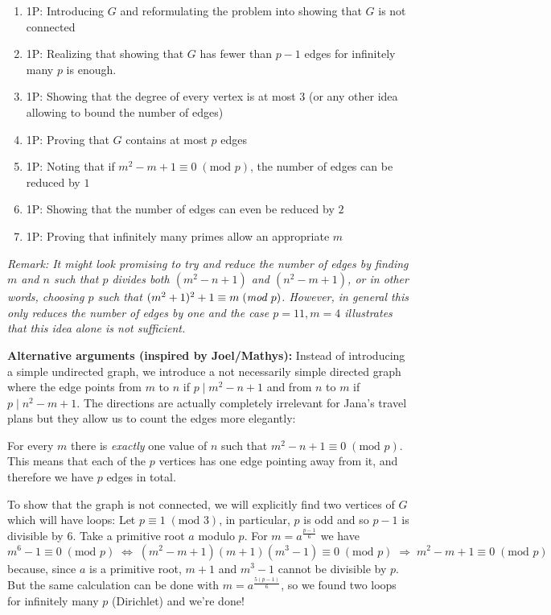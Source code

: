 {\begin{enumerate}
\item 1P: Introducing $G$ and reformulating the problem into showing that $G$ is not connected
\item 1P: Realizing that showing that $G$ has fewer than $p-1$ edges for infinitely many $p$ is enough.
\item 1P: Showing that the degree of every vertex is at most $3$ (or any other idea allowing to bound the number of edges)
\item 1P: Proving that $G$ contains at most $p$ edges
\item 1P: Noting that if $m^2-m+1 \equiv 0 \; (\text{mod } p)$, the number of edges can be reduced by $1$
\item 1P: Showing that the number of edges can even be reduced by $2$
\item 1P: Proving that infinitely many primes allow an appropriate $m$
\end{enumerate}

 \bigskip
 
\emph{Remark: It might look promising to try and reduce the number of edges by finding $m$ and $n$ such that $p$ divides both $(m^2-n+1)$ and $(n^2-m+1)$, or in other words, choosing $p$ such that $(m^2+1)^2 + 1 \equiv m \; (\emph{mod } p)$. However, in general this only reduces the number of edges by one and the case $p=11, m=4$ illustrates that this idea alone is not sufficient. }
 }
 \bigskip
 
\textbf{Alternative arguments (inspired by Joel/Mathys):}
Instead of introducing a simple undirected graph, we introduce a not necessarily simple directed graph where the edge points from $m$ to $n$ if $p \mid m^2 - n + 1$ and from $n$ to $m$ if $p \mid n^2 - m + 1$. The directions are actually completely irrelevant for Jana's travel plans but they allow us to count the edges more elegantly:

For every $m$ there is \emph{exactly} one value of $n$ such that $m^2-n+1 \equiv 0 \; (\text{mod } p) $. This means that each of the $p$ vertices has one edge pointing away from it, and therefore we have $p$ edges in total.

To show that the graph is not connected, we will explicitly find two vertices of $G$ which will have loops: Let $p \equiv 1 \; (\text{mod } 3)$, in particular, $p$ is odd and so $p-1$ is divisible by $6$. Take a primitive root $a$ modulo $p$. For $m = a^{\frac{p-1}{6}}$ we have 
\[
m^6-1 \equiv 0 \; (\text{mod } p) \; \Leftrightarrow \; (m^2-m+1)(m+1)(m^3-1)  \equiv 0 \; (\text{mod } p) \; \Rightarrow \; m^2-m+1 \equiv 0 \; (\text{mod } p)
\]
because, since $a$ is a primitive root, $m+1$ and $m^3-1$ cannot be divisible by $p$. But the same calculation can be done with $m = a^{\frac{5(p-1)}{6}}$, so we found two loops for infinitely many $p$ (Dirichlet) and we're done!